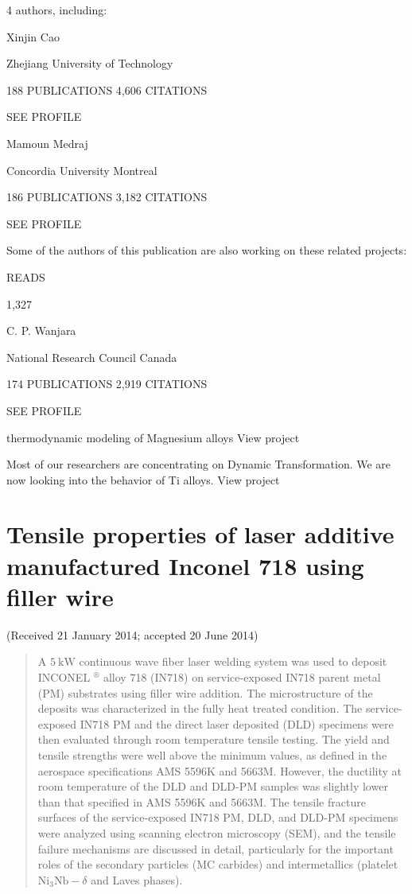 \documentclass[10pt]{article}
\begin{document}
4 authors, including:

Xinjin Cao

Zhejiang University of Technology

188 PUBLICATIONS 4,606 CITATIONS

SEE PROFILE

Mamoun Medraj

Concordia University Montreal

186 PUBLICATIONS 3,182 CITATIONS

SEE PROFILE

Some of the authors of this publication are also working on these related projects:

READS

1,327

C. P. Wanjara

National Research Council Canada

174 PUBLICATIONS 2,919 CITATIONS

SEE PROFILE

thermodynamic modeling of Magnesium alloys View project

Most of our researchers are concentrating on Dynamic Transformation. We are now looking into the behavior of Ti alloys. View project

\section*{Tensile properties of laser additive manufactured Inconel 718 using filler wire }
(Received 21 January 2014; accepted 20 June 2014)

\begin{abstract}
A $5 \mathrm{~kW}$ continuous wave fiber laser welding system was used to deposit INCONEL ${ }^{\circledR}$ alloy 718 (IN718) on service-exposed IN718 parent metal (PM) substrates using filler wire addition. The microstructure of the deposits was characterized in the fully heat treated condition. The service-exposed IN718 PM and the direct laser deposited (DLD) specimens were then evaluated through room temperature tensile testing. The yield and tensile strengths were well above the minimum values, as defined in the aerospace specifications AMS 5596K and 5663M. However, the ductility at room temperature of the DLD and DLD-PM samples was slightly lower than that specified in AMS 5596K and 5663M. The tensile fracture surfaces of the service-exposed IN718 PM, DLD, and DLD-PM specimens were analyzed using scanning electron microscopy (SEM), and the tensile failure mechanisms are discussed in detail, particularly for the important roles of the secondary particles (MC carbides) and intermetallics (platelet $\mathrm{Ni}_{3} \mathrm{Nb}-\delta$ and Laves phases).
\end{abstract}
\end{document}
